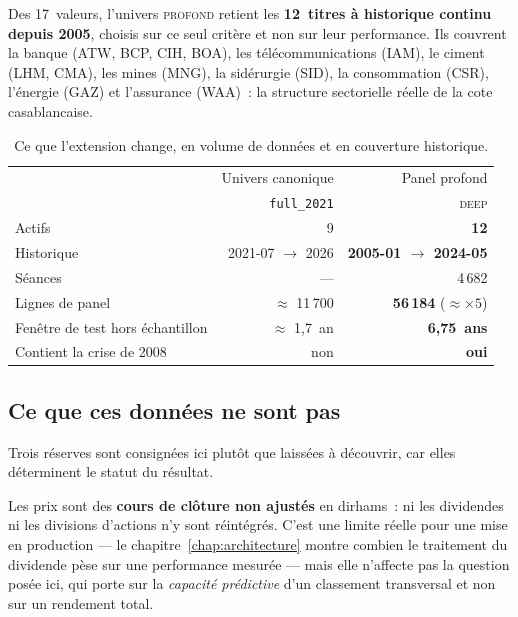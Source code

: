 Des 17~valeurs, l'univers \textsc{profond} retient les \textbf{12~titres à
historique continu depuis 2005}, choisis sur ce seul critère et non sur leur
performance. Ils couvrent la banque (ATW, BCP, CIH, BOA), les
télécommunications (IAM), le ciment (LHM, CMA), les mines (MNG), la sidérurgie
(SID), la consommation (CSR), l'énergie (GAZ) et l'assurance (WAA)~: la
structure sectorielle réelle de la cote casablancaise.

\begin{table}[htbp]
  \centering
  \caption[Univers canonique et panel marocain profond]{Ce que l'extension
  change, en volume de données et en couverture historique.}
  \label{tab:maroc-univers}
  \small
  \begin{tabular}{lrr}
    \toprule
     & Univers canonique & Panel profond \\
     & \texttt{full\_2021} & \textsc{deep} \\
    \midrule
    Actifs                          & 9        & \textbf{12} \\
    Historique                      & 2021-07 $\rightarrow$ 2026 & \textbf{2005-01 $\rightarrow$ 2024-05} \\
    Séances                         & ---      & 4\,682 \\
    Lignes de panel                 & $\approx$ 11\,700 & \textbf{56\,184} ($\approx \times 5$) \\
    Fenêtre de test hors échantillon & $\approx$ 1,7~an & \textbf{6,75~ans} \\
    Contient la crise de 2008        & non      & \textbf{oui} \\
    \bottomrule
  \end{tabular}
\end{table}

\subsection{Ce que ces données ne sont pas}

Trois réserves sont consignées ici plutôt que laissées à découvrir, car elles
déterminent le statut du résultat.

Les prix sont des \textbf{cours de clôture non ajustés} en dirhams~: ni les
dividendes ni les divisions d'actions n'y sont réintégrés. C'est une limite
réelle pour une mise en production — le chapitre~\ref{chap:architecture} montre
combien le traitement du dividende pèse sur une performance mesurée — mais elle
n'affecte pas la question posée ici, qui porte sur la \emph{capacité
prédictive} d'un classement transversal et non sur un rendement total.

